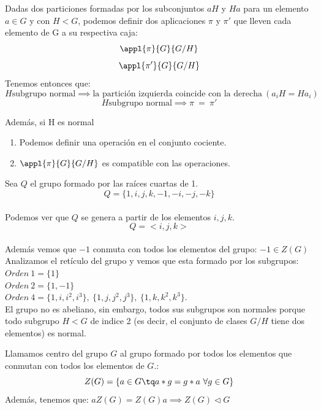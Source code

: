 \documentclass[a4paper,10pt]{apuntes}
\begin{document}
  \begin{lemma}
   Dadas dos particiones formadas por los subconjuntos $aH$ y $Ha$ para un elemento $a \in G$ y con $H <G$, podemos definir dos aplicaciones $\pi$ y $\pi '$ que lleven cada elemento de G a su respectiva caja:
   $$\appl{\pi}{G}{G/H}$$
   $$\appl{\pi'}{G}{G/H}$$
   Tenemos entonces que:
   $$H \text{subgrupo normal} \implies \text{la partición izquierda coincide con la derecha}\ (a_iH = Ha_i)$$
   $$H \text{subgrupo normal} \implies \pi \ =\ \pi '$$

   
   Además, si H es normal
   \begin{enumerate}
	\item Podemos definir una operación en el conjunto cociente.     
	\item $\appl{\pi}{G}{G/H}$ es compatible con las operaciones.
   \end{enumerate}
  \end{lemma}
  
  \begin{example}
	Sea $Q$ el grupo formado por las raíces cuartas de 1.\\
	$$Q = \{ 1, i, j, k, -1, -i, -j, -k\} $$\\
	Podemos ver que $Q$ se genera a partir de los elementos $i, j, k$.\\
	$$Q = <i,j,k>$$\\
	Además vemos que $-1$ conmuta con todos los elementos del grupo: $-1 \in Z(G)$
	Analizamos el retículo del grupo y vemos que esta formado por los subgrupos:
	\\
	$Orden\ 1 = \{ 1\} $\\
	$Orden\ 2 = \{ 1, -1\} $\\
	$Orden\ 4 = \{ 1, i, i^2, i^3\},\
			  \{ 1, j, j^2, j^3 \},\
			  \{ 1, k, k^2, k^3 \}.$\\
		  
	El grupo no es abeliano, sin embargo, todos sus subgrupos son normales porque todo subgrupo $H<G$ de indice 2 (es decir, el conjunto de clases $G/H$ tiene dos elementos) es normal.
	
  \end{example}
  
    \begin{defn}[Centro]
	Llamamos centro del grupo $G$ al grupo formado por todos los elementos que conmutan con todos los elementos de $G$.:\\
	$$Z(G) = \{ a\in G\tq a\ast g = g\ast a\ \forall g\in G\} $$
	Además, tenemos que:
	$aZ(G)=Z(G)a \implies Z(G)\lhd G$
  \end{defn}
   
\end{document}
